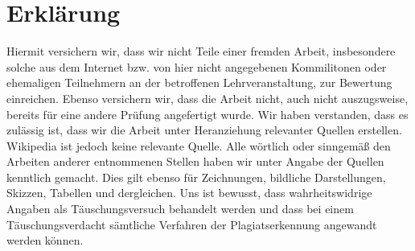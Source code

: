 \documentclass{Gharaei}
\begin{document}
\section {Erklärung}
Hiermit versichern wir, dass wir nicht Teile einer fremden Arbeit, insbesondere solche aus dem Internet bzw. von hier nicht angegebenen Kommilitonen oder ehemaligen Teilnehmern an der betroffenen Lehrveranstaltung, zur Bewertung einreichen. Ebenso versichern wir, dass die Arbeit nicht, auch nicht auszugsweise, bereits für eine andere Prüfung angefertigt wurde. Wir  haben  verstanden,  dass  es  zulässig  ist,  dass  wir  die  Arbeit  unter  Heranziehung  relevanter  Quellen  erstellen.  Wikipedia  ist  jedoch  keine  relevante  Quelle. Alle wörtlich oder sinngemäß den Arbeiten anderer entnommenen Stellen haben wir unter Angabe der Quellen kenntlich gemacht. Dies gilt ebenso für Zeichnungen, bildliche Darstellungen, Skizzen, Tabellen und dergleichen.  Uns ist bewusst, dass wahrheitswidrige Angaben als Täuschungsversuch behandelt werden und dass bei einem Täuschungsverdacht sämtliche Verfahren der Plagiatserkennung angewandt werden können.
\end{document}
